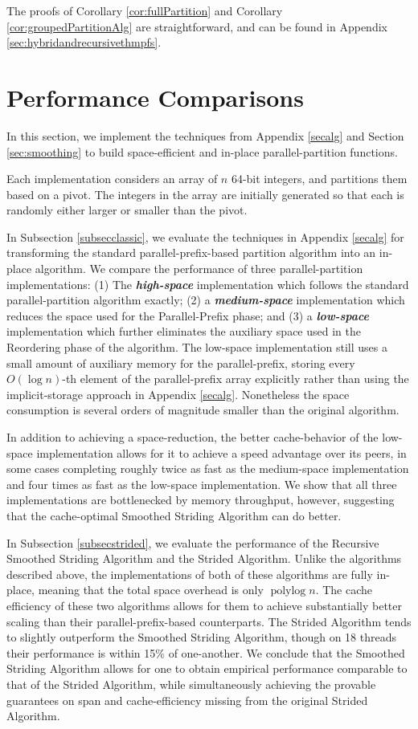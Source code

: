 \documentclass[twoside,leqno,twocolumn]{article}
\newcommand{\polylog}{\operatorname{polylog}}
\newcommand{\defn}[1]{{\textit{\textbf{\boldmath #1}}}}
\begin{document}
The proofs of Corollary \ref{cor:fullPartition} and Corollary
\ref{cor:groupedPartitionAlg} are straightforward, and can be
found in Appendix \ref{sec:hybridandrecursivethmpfs}.

\section{Performance Comparisons}\label{secexp}

In this section, we implement the techniques from Appendix
\ref{secalg} and Section \ref{sec:smoothing} to build space-efficient and
in-place parallel-partition functions.


Each implementation considers an array of $n$ 64-bit integers, and
partitions them based on a pivot. The integers in the array are
initially generated so that each is randomly either larger or smaller
than the pivot.

In Subsection \ref{subsecclassic}, we evaluate the techniques in
Appendix \ref{secalg} for transforming the standard
parallel-prefix-based partition algorithm into an in-place
algorithm. We compare the performance of three parallel-partition
implementations: (1) The \defn{high-space} implementation which
follows the standard parallel-partition algorithm exactly; (2) a
\defn{medium-space} implementation which reduces the space used for
the Parallel-Prefix phase; and (3) a \defn{low-space} implementation
which further eliminates the auxiliary space used in the Reordering
phase of the algorithm. The low-space implementation still uses a
small amount of auxiliary memory for the parallel-prefix, storing
every $O(\log n)$-th element of the parallel-prefix array explicitly
rather than using the implicit-storage approach in Appendix
\ref{secalg}. Nonetheless the space consumption is several orders of
magnitude smaller than the original algorithm.

In addition to achieving a space-reduction, the better cache-behavior
of the low-space implementation allows for it to achieve a speed
advantage over its peers, in some cases completing roughly twice as
fast as the medium-space implementation and four times as fast as the
low-space implementation. We show that all three implementations are
bottlenecked by memory throughput, however, suggesting that the cache-optimal Smoothed Striding Algorithm can do better.

In Subsection \ref{subsecstrided}, we evaluate the performance of the
Recursive Smoothed Striding Algorithm and the Strided
Algorithm. Unlike the algorithms described above, the implementations
of both of these algorithms are fully in-place, meaning that the total
space overhead is only $\polylog n$. The cache efficiency of these two
algorithms allows for them to achieve substantially better scaling
than their parallel-prefix-based counterparts. The Strided Algorithm
tends to slightly outperform the Smoothed Striding Algorithm, though
on 18 threads their performance is within 15\% of one-another. We
conclude that the Smoothed Striding Algorithm allows for one to obtain
empirical performance comparable to that of the Strided Algorithm,
while simultaneously achieving the provable guarantees on span and
cache-efficiency missing from the original Strided Algorithm.
\end{document}
